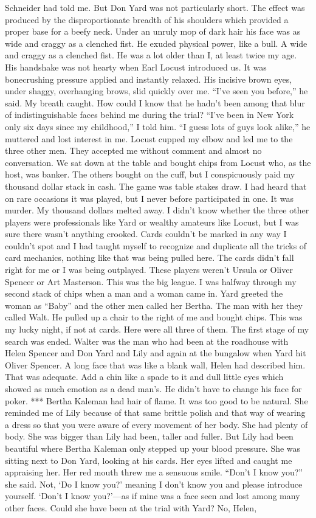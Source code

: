 \documentclass{novel}
\begin{document}
Schneider had told me. But Don Yard was not particularly short. The effect was produced by the disproportionate breadth of his shoulders which provided a proper base for a beefy neck. Under an unruly mop of dark hair his face was as wide and craggy as a clenched fist. He exuded physical power, like a bull. A wide and craggy as a clenched fist. He was a lot older than I, at least twice my age. His handshake was not hearty when Earl Locust introduced us. It was bonecrushing pressure applied and instantly relaxed. His incisive brown eyes, under shaggy, overhanging brows, slid quickly over me. “I’ve seen you before,” he said. My breath caught. How could I know that he hadn’t been among that blur of indistinguishable faces behind me during the trial? “I’ve been in New York only six days since my childhood,” I told him. “I guess lots of guys look alike,” he muttered and lost interest in me. Locust cupped my elbow and led me to the three other men. They accepted me without comment and almost no conversation. We sat down at the table and bought chips from Locust who, as the host, was banker. The others bought on the cuff, but I conspicuously paid my thousand dollar stack in cash. The game was table stakes draw. I had heard that on rare occasions it was played, but I never before participated in one. It was murder. My thousand dollars melted away. I didn’t know whether the three other players were professionals like Yard or wealthy amateurs like Locust, but I was sure there wasn’t anything crooked. Cards couldn’t be marked in any way I couldn’t spot and I had taught myself to recognize and duplicate all the tricks of card mechanics, nothing like that was being pulled here. The cards didn’t fall right for me or I was being outplayed. These players weren’t Ursula or Oliver Spencer or Art Masterson. This was the big league. I was halfway through my second stack of chips when a man and a woman came in. Yard greeted the woman as “Baby” and the other men called her Bertha. The man with her they called Walt. He pulled up a chair to the right of me and bought chips. This was my lucky night, if not at cards. Here were all three of them. The first stage of my search was ended. Walter was the man who had been at the roadhouse with Helen Spencer and Don Yard and Lily and again at the bungalow when Yard hit Oliver Spencer. A long face that was like a blank wall, Helen had described him. That was adequate. Add a chin like a spade to it and dull little eyes which showed as much emotion as a dead man’s. He didn’t have to change his face for poker. *** Bertha Kaleman had hair of flame. It was too good to be natural. She reminded me of Lily because of that same brittle polish and that way of wearing a dress so that you were aware of every movement of her body. She had plenty of body. She was bigger than Lily had been, taller and fuller. But Lily had been beautiful where Bertha Kaleman only stepped up your blood pressure. She was sitting next to Don Yard, looking at his cards. Her eyes lifted and caught me appraising her. Her red mouth threw me a sensuous smile. “Don’t I know you?” she said. Not, ‘Do I know you?’ meaning I don’t know you and please introduce yourself. ‘Don’t I know you?’—as if mine was a face seen and lost among many other faces. Could she have been at the trial with Yard? No, Helen, 
\end{document}
